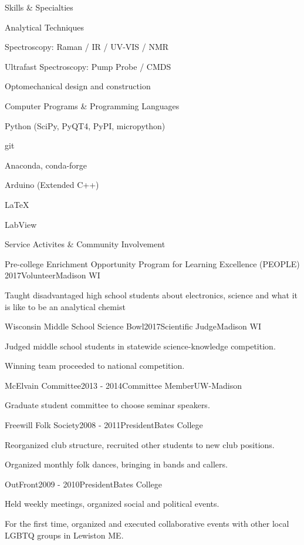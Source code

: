 \documentclass{resume}  %
\begin{document}
\begin{rSection}{Skills \& Specialties}
  \begin{rSubsection}{Analytical Techniques}{}{}{}
    \item Spectroscopy: Raman / IR / UV-VIS / NMR
    \item Ultrafast Spectroscopy: Pump Probe / CMDS
    \item Optomechanical design and construction
  \end{rSubsection}
  \begin{rSubsection}{Computer Programs \& Programming Languages}{}{}{}
    \item Python (SciPy, PyQT4, PyPI, micropython)
    \item git
    \item Anaconda, conda-forge
    \item Arduino (Extended C++)
    \item LaTeX
    \item LabView
  \end{rSubsection}
\end{rSection}

\pagebreak

\begin{rSection}{Service Activites \& Community Involvement}
  \begin{rSubsection}{Pre-college Enrichment Opportunity Program for Learning Excellence (PEOPLE)}
    {2017}{Volunteer}{Madison WI}
	  \item Taught disadvantaged high school students about electronics, science and what it is like
      to be an analytical chemist
  \end{rSubsection}
  \begin{rSubsection}{Wisconsin Middle School Science Bowl}{2017}{Scientific Judge}{Madison WI}
    \item Judged middle school students in statewide science-knowledge competition.
    \item Winning team proceeded to national competition.
  \end{rSubsection}
  \begin{rSubsection}{McElvain Committee}{2013 - 2014}{Committee Member}{UW-Madison}
    \item Graduate student committee to choose seminar speakers.
  \end{rSubsection}
  \begin{rSubsection}{Freewill Folk Society}{2008 - 2011}{President}{Bates College}
    \item Reorganized club structure, recruited other students to new club positions.
    \item Organized monthly folk dances, bringing in bands and callers.
  \end{rSubsection}
  \begin{rSubsection}{OutFront}{2009 - 2010}{President}{Bates College}
    \item Held weekly meetings, organized social and political events.
    \item For the first time, organized and executed collaborative events with other local LGBTQ
      groups in Lewiston ME.
  \end{rSubsection}
\end{rSection}
\end{document}
